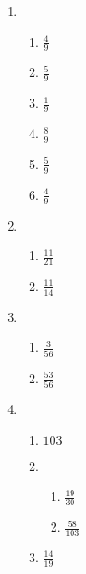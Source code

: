 {\begin{multicols}{3}
\begin{enumerate}[noitemsep, label=\textbf{\arabic*}. ]
      \item %
	    \begin{enumerate}[itemsep=1pt, label=\textbf{(\alph*)} ]
		\item $\frac{4}{9}$%
		\item $\frac{5}{9}$%
		\item $\frac{1}{9}$%
		\item $\frac{8}{9}$%
		\item $\frac{5}{9}$%
		\item $\frac{4}{9}$%
	    \end{enumerate}

      \item %
	    \begin{enumerate}[itemsep=1pt, label=\textbf{(\alph*)} ]
		\item $\frac{11}{21}$%
		\item $\frac{11}{14}$%
	    \end{enumerate}

      \item %
	    \begin{enumerate}[itemsep=1pt, label=\textbf{(\alph*)} ]
		\item$\frac{3}{56}$%
		\item $\frac{53}{56}$%
	    \end{enumerate}

      \item %
	    \begin{enumerate}[noitemsep, label=\textbf{(\alph*)} ]
		\item $103$ %
		\item %
		    \begin{enumerate}[itemsep=1pt,  label=\textbf{\roman*}. ] 
			\item $\frac{19}{30}$%
			\item $\frac{58}{103}$%
		    \end{enumerate} 
		\item $\frac{14}{19}$%
	    \end{enumerate}


\end{enumerate}
\end{multicols}}
